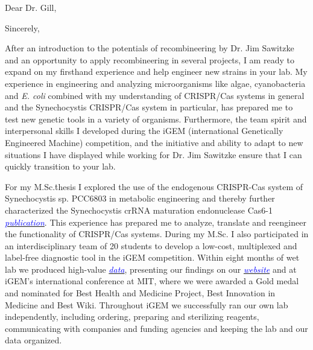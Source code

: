 \documentclass[11pt,a4paper,sans]{moderncv}
\begin{document}
\thispagestyle{titlepage}
\date{\today}
\opening{Dear Dr. Gill,}
\closing{Sincerely,}
\makelettertitle
\begin{spacing}{1.1}

After an introduction to the potentials of recombineering by Dr. Jim Sawitzke and an opportunity to apply recombineering in several projects, I am ready to expand on my firsthand experience and help engineer new strains in your lab. %
My experience in engineering and analyzing microorganisms like algae, cyanobacteria and \textit{E. coli} combined with my understanding of CRISPR/Cas systems in general and the Synechocystis CRISPR/Cas system in particular, has prepared me to test new genetic tools in a variety of organisms.
Furthermore, the team spirit and interpersonal skills I developed during the iGEM (international Genetically Engineered Machine) competition, and the initiative and ability to adapt to new situations I have displayed while working for Dr. Jim Sawitzke ensure that I can quickly transition to your lab.\par %

For my M.Sc.\. thesis I explored the use of the endogenous CRISPR-Cas system of Synechocystis sp. PCC6803 in metabolic engineering and thereby further characterized the Synechocystis crRNA maturation endonuclease Cas6-1 {\href{https://www.tandfonline.com/eprint/vmAQ3vjYGdZIZpIKQTIT/full}{\textcolor{blue}{\textit{publication}}}}.
This experience has prepared me to analyze, translate and reengineer the functionality of CRISPR/Cas systems. 
During my M.Sc. I also participated in an interdisciplinary team of 20 students to develop a low-cost, multiplexed and label-free diagnostic tool in the iGEM competition.
Within eight months of wet lab we produced high-value {\href{https://www.ncbi.nlm.nih.gov/pubmed/29803867}{\textcolor{blue}{\textit{data}}}}, presenting our findings on our 
{\href{http://2015.igem.org/Team:Freiburg/Home_Intro}{\textcolor{blue}{\textit{website}}}} and at iGEM's international conference at MIT, where we were awarded a Gold medal and nominated for Best Health and Medicine Project, Best Innovation in Medicine and Best Wiki.
Throughout iGEM we successfully ran our own lab independently, including ordering, preparing and sterilizing reagents, communicating with companies and funding agencies and keeping the lab and our data organized. \par


\end{spacing}
\end{document}
